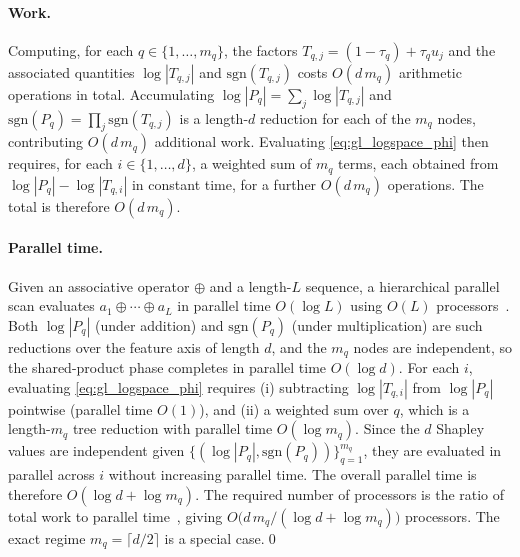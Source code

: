 \paragraph{Work.}
Computing, for each $q\in\{1,\dots,m_q\}$, the factors $T_{q,j}=(1-\tau_q)+\tau_q u_j$ and the associated quantities $\log|T_{q,j}|$ and $\mathrm{sgn}(T_{q,j})$ costs $O(d\,m_q)$ arithmetic operations in total. Accumulating $\log|P_q|=\sum_j \log|T_{q,j}|$ and $\mathrm{sgn}(P_q)=\prod_j \mathrm{sgn}(T_{q,j})$ is a length-$d$ reduction for each of the $m_q$ nodes, contributing $O(d\,m_q)$ additional work. Evaluating \cref{eq:gl_logspace_phi} then requires, for each $i\in\{1,\dots,d\}$, a weighted sum of $m_q$ terms, each obtained from $\log|P_q|-\log|T_{q,i}|$ in constant time, for a further $O(d\,m_q)$ operations. The total is therefore $O(d\,m_q)$.

\paragraph{Parallel time.}
Given an associative operator $\oplus$ and a length-$L$ sequence, a hierarchical parallel scan evaluates $a_1\oplus\cdots\oplus a_L$ in parallel time $O(\log L)$ using $O(L)$ processors~\citep{blelloch1990prefix}. Both $\log|P_q|$ (under addition) and $\mathrm{sgn}(P_q)$ (under multiplication) are such reductions over the feature axis of length $d$, and the $m_q$ nodes are independent, so the shared-product phase completes in parallel time $O(\log d)$. For each $i$, evaluating \cref{eq:gl_logspace_phi} requires (i) subtracting $\log|T_{q,i}|$ from $\log|P_q|$ pointwise (parallel time $O(1)$), and (ii) a weighted sum over $q$, which is a length-$m_q$ tree reduction with parallel time $O(\log m_q)$. Since the $d$ Shapley values are independent given $\{(\log|P_q|,\mathrm{sgn}(P_q))\}_{q=1}^{m_q}$, they are evaluated in parallel across $i$ without increasing parallel time. The overall parallel time is therefore $O(\log d+\log m_q)$. The required number of processors is the ratio of total work to parallel time~\citep{brent1974parallel}, giving $O\!\bigl(d\,m_q/(\log d+\log m_q)\bigr)$ processors. The exact regime $m_q=\lceil d/2\rceil$ is a special case.\qed

